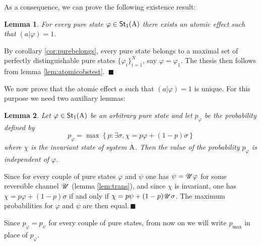 \documentclass[12pt,aps,pra,showpacs,groupedaddress]{revtex4-1}
\newtheorem{lemma}{Lemma} \newtheorem{proposition}{Proposition}
\def\Proof{\medskip\par\noindent{\bf Proof. }}
\def\qed{$\,\blacksquare$\par}
\def\Stset{{\mathsf{St}}}
\def\SC#1#2{\left(#1\right|\left.\!#2\right)}  \def\Tr{{\rm Tr}}
\begin{document}
 As a consequence, we can prove the following existence result:
 \begin{lemma}\label{lem:thereexistsaneffect}
   For every pure state $\varphi\in\Stset_1 (\rA)$ there exists an atomic effect such that $\SC a
   \varphi =1$.
 \end{lemma}
 \Proof By corollary \ref{cor:purebelongs}, every pure state belongs to a maximal set of perfectly
 distinguishable pure states $\{\varphi_i\}_{i=1}^N$, say $\varphi = \varphi_1$.  The thesis then
 follows from lemma \ref{lem:atomicobstest}. \qed
 
 We now prove that the atomic effect $a$ such that $(a|\varphi)=1$ is unique. For this purpose we
 need two auxiliary lemmas:
 \begin{lemma}\label{lem:samepmax}
   Let $\varphi\in\Stset_1 (\rA)$ be an arbitrary pure state and let $p_{\varphi}$ be the
   probability defined by
\begin{equation}
p_{\varphi} = \max\left\{ p  :    \exists \sigma , \chi = p \varphi + (1-p) \sigma\right\}
\end{equation}
where $\chi$ is the invariant state of system ${\rm A}$. Then the value of the probability $p_{\varphi}$ is independent of $\varphi$. 
 \end{lemma}
  
 \Proof Since for every couple of pure states $\varphi$ and $\psi$ one has $\psi = \mathscr U \varphi$ for
 some reversible channel $\mathscr U $ (lemma \ref{lem:trans}), and since $\chi$ is invariant, one has $\chi = p \varphi + (1-p)
 \sigma$ if and only if $\chi = p \psi + (1-p) \mathscr U \sigma$.  The maximum probabilities for $\varphi$
 and $\psi$ are then equal.\qed Since $p_\varphi = p_\psi$ for every couple of pure states, from now
 on we will write $p_{\max}$ in place of $p_\varphi$.
 
\end{document}
